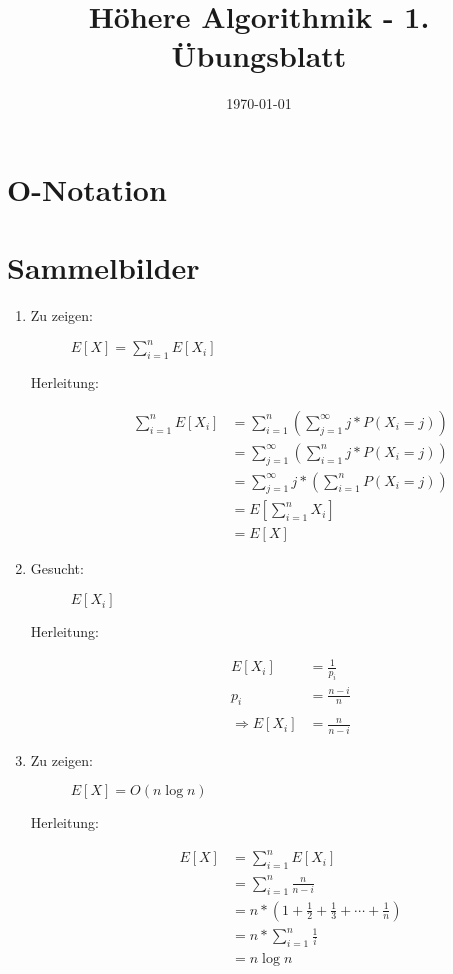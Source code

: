 \documentclass[a4paper,10pt]{scrartcl}
\title{H\"ohere Algorithmik - 1. \"Ubungsblatt}
\author{\Authors}
\date{\today}
\begin{document}
\maketitle

\section{$\boldsymbol{O}$-Notation}
\section{Sammelbilder}
\begin{enumerate}
\item \begin{description}
		\item[Zu zeigen:] $E[X] = \sum\limits_{i = 1}^{n} E[X_{i}]$
		\item[Herleitung:]	\begin{align*}
								\sum\limits_{i = 1}^{n} E\left[X_{i}\right] &= \sum\limits_{i = 1}^{n}\left(\sum\limits_{j = 1}^{\infty}j * P\left(X_{i} = j\right)\right)\\
								&=\sum\limits_{j = 1}^{\infty}\left(\sum\limits_{i = 1}^{n}j * P\left(X_{i} = j\right)\right)\\
								&=\sum\limits_{j = 1}^{\infty}j * \left(\sum\limits_{i = 1}^{n}P\left(X_{i} = j\right)\right)\\
								&= E\left[\sum\limits_{i = 1}^{n}X_{i}\right]\\
								&= E\left[X\right]
							\end{align*}
	\end{description}

\item \begin{description}
		\item[Gesucht:] $E[X_{i}]$
		\item[Herleitung:] \begin{align*}
		E\left[X_{i}\right] &= \frac{1}{p_{i}}\\
		p_{i} &= \frac{n-i}{n}\\
		\\
		\Rightarrow E\left[X_{i}\right] &= \frac{n}{n-i}	
	\end{align*}\end{description}
\item \begin{description}
		\item[Zu zeigen:] $E[X] = O(n \log n)$ 
		\item[Herleitung:] \begin{align*}
		E\left[X\right] &= \sum\limits_{i = 1}^{n}E\left[X_{i}\right]\\
		&= \sum\limits_{i = 1}^{n}\frac{n}{n - i}\\
		&= n * \left(1 + \frac{1}{2} + \frac{1}{3} + \cdots + \frac{1}{n}\right)\\
		&= n * \sum\limits_{i = 1}^{n}\frac{1}{i}\\
		&= n \log n
	\end{align*}\end{description}
\end{enumerate}
\end{document}
